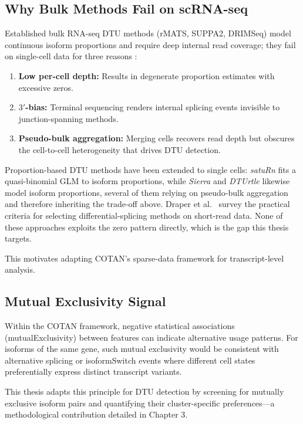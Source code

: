 \subsection{Why Bulk Methods Fail on scRNA-seq}
Established bulk RNA-seq DTU methods (rMATS, SUPPA2, DRIMSeq) model continuous isoform proportions and require deep internal read coverage; they fail on single-cell data for three reasons \cite{galfre2021cotan, love2018swimming}:
\begin{enumerate}
    \item \textbf{Low per-cell depth:} Results in degenerate proportion estimates with excessive zeros.
    \item \textbf{$3'$-bias:} Terminal sequencing renders internal splicing events invisible to junction-spanning methods.
    \item \textbf{Pseudo-bulk aggregation:} Merging cells recovers read depth but obscures the cell-to-cell heterogeneity that drives DTU detection.
\end{enumerate}

Proportion-based DTU methods have been extended to single cells: \textit{satuRn} \cite{gilis2021satuRn} fits a quasi-binomial GLM to isoform proportions, while \textit{Sierra} \cite{patrick2020sierra} and \textit{DTUrtle} \cite{tekath2021dturtle} likewise model isoform proportions, several of them relying on pseudo-bulk aggregation and therefore inheriting the trade-off above. Draper et al.\ \cite{draper2025selecting} survey the practical criteria for selecting differential-splicing methods on short-read data. None of these approaches exploits the zero pattern directly, which is the gap this thesis targets.

This motivates adapting COTAN's sparse-data framework for transcript-level analysis.


\subsection{Mutual Exclusivity Signal}
Within the COTAN framework, negative statistical associations (\gls{mutualExclusivity}) between features can indicate alternative usage patterns. For isoforms of the same gene, such mutual exclusivity would be consistent with alternative splicing or \gls{isoformSwitch} events where different cell states preferentially express distinct transcript variants.

This thesis adapts this principle for DTU detection by screening for mutually exclusive isoform pairs and quantifying their cluster-specific preferences—a methodological contribution detailed in Chapter 3.

